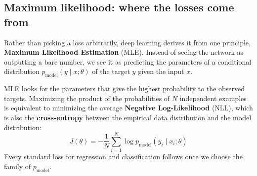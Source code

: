 \subsection{Maximum likelihood: where the losses come from}
Rather than picking a loss arbitrarily, deep learning derives it from one
principle, \textbf{Maximum Likelihood Estimation} (MLE). Instead of seeing the
network as outputting a bare number, we see it as predicting the parameters of a
conditional distribution $p_{\text{model}}(y \mid x; \theta)$ of the target $y$
given the input $x$.

MLE looks for the parameters that give the highest probability to the observed
targets. Maximizing the product of the probabilities of $N$ independent examples is
equivalent to minimizing the average \textbf{Negative Log-Likelihood} (NLL), which
is also the \textbf{cross-entropy} between the empirical data distribution and the
model distribution:
\begin{equation}
    J(\theta) = -\frac{1}{N} \sum_{i=1}^N \log p_{\text{model}}(y_i \mid x_i; \theta)
\end{equation}
Every standard loss for regression and classification follows once we choose the
family of $p_{\text{model}}$.

